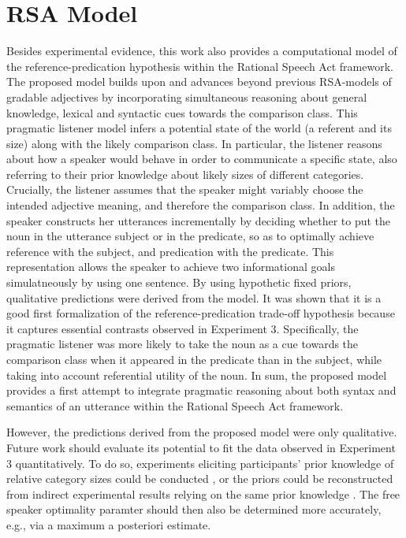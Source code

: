 \section{RSA Model}
Besides experimental evidence, this work also provides a computational model of the reference-predication hypothesis within the Rational Speech Act framework. The proposed model builds upon and advances beyond previous RSA-models of gradable adjectives by incorporating simultaneous reasoning about general knowledge, lexical and syntactic cues towards the comparison class. This pragmatic listener model infers a potential state of the world (a referent and its size) along with the likely comparison class. In particular, the listener reasons about how a speaker would behave in order to communicate a specific state, also referring to their prior knowledge about likely sizes of different categories. Crucially, the listener assumes that the speaker might variably choose the intended adjective meaning, and therefore the comparison class. 
In addition, the speaker constructs her utterances incrementally by deciding whether to put the noun in the utterance subject or in the predicate, so as to optimally achieve reference with the subject, and predication with the predicate. This representation allows the speaker to achieve two informational goals simulatneously by using one sentence. By using hypothetic fixed priors, qualitative predictions were derived from the model. It was shown that it is a good first formalization of the reference-predication trade-off hypothesis because it captures essential contrasts observed in Experiment 3. Specifically, the pragmatic listener was more likely to take the noun as a cue towards the comparison class when it appeared in the predicate than in the subject, while taking into account referential utility of the noun. In sum, the proposed model provides a first attempt to integrate pragmatic reasoning about both syntax and semantics of an utterance within the Rational Speech Act framework. 

However, the predictions derived from the proposed model were only qualitative. Future work should evaluate its potential to fit the data observed in Experiment 3 quantitatively. To do so, experiments eliciting participants' prior knowledge of relative category sizes could be conducted \parencite{franke2016does}, or the priors could be reconstructed from indirect experimental results relying on the same prior knowledge \parencite[following][]{tessler2017warm}. The free speaker optimality paramter should then also be determined more accurately, e.g., via a maximum a posteriori estimate. %

